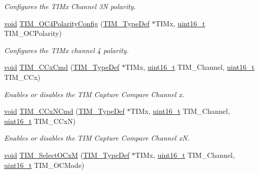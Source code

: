 \begin{DoxyCompactItemize}
\begin{DoxyCompactList}\small\item\em Configures the T\+I\+Mx Channel 3N polarity. \end{DoxyCompactList}\item 
\hyperlink{usb__devapi_8h_afabf60e7f57651d6d595a02c75f07cd0}{void} \hyperlink{group___t_i_m___private___functions_gad678410f7c7244f83daad93ce9d1056e}{T\+I\+M\+\_\+\+O\+C4\+Polarity\+Config} (\hyperlink{struct_t_i_m___type_def}{T\+I\+M\+\_\+\+Type\+Def} $\ast$T\+I\+Mx, \hyperlink{_p_e___types_8h_a1f1825b69244eb3ad2c7165ddc99c956}{uint16\+\_\+t} T\+I\+M\+\_\+\+O\+C\+Polarity)
\begin{DoxyCompactList}\small\item\em Configures the T\+I\+Mx channel 4 polarity. \end{DoxyCompactList}\item 
\hyperlink{usb__devapi_8h_afabf60e7f57651d6d595a02c75f07cd0}{void} \hyperlink{group___t_i_m___private___functions_ga3ecc4647d9ede261beb5e0535cf29ebb}{T\+I\+M\+\_\+\+C\+Cx\+Cmd} (\hyperlink{struct_t_i_m___type_def}{T\+I\+M\+\_\+\+Type\+Def} $\ast$T\+I\+Mx, \hyperlink{_p_e___types_8h_a1f1825b69244eb3ad2c7165ddc99c956}{uint16\+\_\+t} T\+I\+M\+\_\+\+Channel, \hyperlink{_p_e___types_8h_a1f1825b69244eb3ad2c7165ddc99c956}{uint16\+\_\+t} T\+I\+M\+\_\+\+C\+Cx)
\begin{DoxyCompactList}\small\item\em Enables or disables the T\+IM Capture Compare Channel x. \end{DoxyCompactList}\item 
\hyperlink{usb__devapi_8h_afabf60e7f57651d6d595a02c75f07cd0}{void} \hyperlink{group___t_i_m___private___functions_ga304ff7c8a1615498da749bf2507e9f2b}{T\+I\+M\+\_\+\+C\+Cx\+N\+Cmd} (\hyperlink{struct_t_i_m___type_def}{T\+I\+M\+\_\+\+Type\+Def} $\ast$T\+I\+Mx, \hyperlink{_p_e___types_8h_a1f1825b69244eb3ad2c7165ddc99c956}{uint16\+\_\+t} T\+I\+M\+\_\+\+Channel, \hyperlink{_p_e___types_8h_a1f1825b69244eb3ad2c7165ddc99c956}{uint16\+\_\+t} T\+I\+M\+\_\+\+C\+CxN)
\begin{DoxyCompactList}\small\item\em Enables or disables the T\+IM Capture Compare Channel xN. \end{DoxyCompactList}\item 
\hyperlink{usb__devapi_8h_afabf60e7f57651d6d595a02c75f07cd0}{void} \hyperlink{group___t_i_m___private___functions_ga83ea0af5a7c1af521236ce5e4d2c42b0}{T\+I\+M\+\_\+\+Select\+O\+CxM} (\hyperlink{struct_t_i_m___type_def}{T\+I\+M\+\_\+\+Type\+Def} $\ast$T\+I\+Mx, \hyperlink{_p_e___types_8h_a1f1825b69244eb3ad2c7165ddc99c956}{uint16\+\_\+t} T\+I\+M\+\_\+\+Channel, \hyperlink{_p_e___types_8h_a1f1825b69244eb3ad2c7165ddc99c956}{uint16\+\_\+t} T\+I\+M\+\_\+\+O\+C\+Mode)

\end{DoxyCompactItemize}

